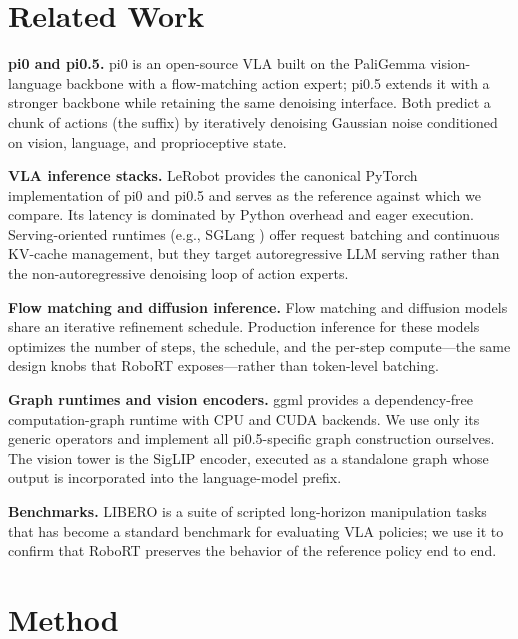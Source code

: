 \documentclass[11pt]{article}
\begin{document}
\section{Related Work}
\label{sec:related}

\textbf{pi0 and pi0.5.} pi0 \cite{pi0} is an open-source VLA built on the
PaliGemma vision-language backbone with a flow-matching action expert;
pi0.5 \cite{pi05} extends it with a stronger backbone while retaining the
same denoising interface. Both predict a chunk of actions (the suffix) by
iteratively denoising Gaussian noise conditioned on vision, language, and
proprioceptive state.

\textbf{VLA inference stacks.} LeRobot \cite{lerobot} provides the canonical
PyTorch implementation of pi0 and pi0.5 and serves as the reference against
which we compare. Its latency is dominated by Python overhead and eager
execution. Serving-oriented runtimes (e.g., SGLang \cite{sglang}) offer
request batching and continuous KV-cache management, but they target
autoregressive LLM serving rather than the non-autoregressive denoising loop
of action experts.

\textbf{Flow matching and diffusion inference.} Flow matching
\cite{flowmatching} and diffusion models \cite{ddpm} share an iterative
refinement schedule. Production inference for these models optimizes the
number of steps, the schedule, and the per-step compute---the same design
knobs that RoboRT exposes---rather than token-level batching.

\textbf{Graph runtimes and vision encoders.} ggml \cite{ggml} provides a
dependency-free computation-graph runtime with CPU and CUDA backends. We use
only its generic operators and implement all pi0.5-specific graph
construction ourselves. The vision tower is the SigLIP \cite{siglip}
encoder, executed as a standalone graph whose output is incorporated into
the language-model prefix.

\textbf{Benchmarks.} LIBERO \cite{libero} is a suite of scripted
long-horizon manipulation tasks that has become a standard benchmark for
evaluating VLA policies; we use it to confirm that RoboRT preserves the
behavior of the reference policy end to end.

\section{Method}
\label{sec:method}
\end{document}
